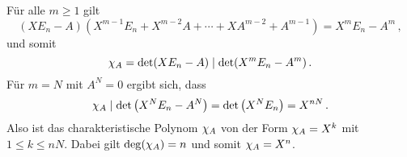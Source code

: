 \section{}





\addtocounter{subsection}{1}





\subsection{}

Für alle $m \geq 1$ gilt
\[
    (X E_n - A)(X^{m-1} E_n + X^{m-2} A + \dotsb + X A^{m-2} + A^{m-1})
  = X^m E_n - A^m \,,
\]
und somit
\[
            \chi_{A}
  =         \det(X E_n - A)
  \mathrel{|}  \det(X^m E_n - A^m) \,.
\]
Für $m = N$ mit $A^N = 0$ ergibt sich, dass
\[
            \chi_{A}
  \mathrel{|}  \det\left( X^N E_n - A^N \right)
  =         \det\left( X^N E_n \right)
  =         X^{nN} \,.
\]
Also ist das charakteristische Polynom $\chi_{A}$ von der Form $\chi_{A} = X^k$ mit $1 \leq k \leq nN$.
Dabei gilt $\deg(\chi_{A}) = n$ und somit $\chi_{A} = X^n$.
